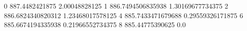 0 887.4482421875 2.00048828125
1 886.7494506835938 1.30169677734375
2 886.6824340820312 1.23468017578125
4 885.7433471679688 0.29559326171875
6 885.6674194335938 0.21966552734375
8 885.44775390625 0.0
